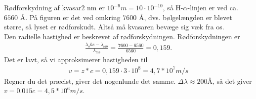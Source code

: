 \begin{opgave}{Rødforskydning af kvasar}{2}
	\opg nm er $10^{-9} m= 10 \cdot 10^{-10}$, så H-$\alpha$-linjen er ved ca. $6560$ Å. På figuren er det ved omkring $7600$ Å, dvs. bølgelængden er blevet større, så lyset er rødforskudt. Altså må kvasaren bevæge sig væk fra os.\\
	\opg Den radielle hastighed er beskrevet af rødforskydningen. Rødforskydningen er
	\begin{align}
		\frac{\lambda_obs-\lambda_{lab}}{\lambda_{lab}} = \frac{7600-6560}{6560} = 0,159.
	\end{align}
	Det er lavt, så vi approksimerer hastigheden til
	\begin{align}
		v= z*c = 0,159 \cdot 3\cdot 10^8 = 4,7*10^7 m/s
	\end{align}
	Regner du det præcist, giver det nogenlunde det samme.
	\opg $\Delta\lambda \approx 200 Å$, så det giver $v=0.015 c = 4,5*10^6 m/s$.
\end{opgave}

